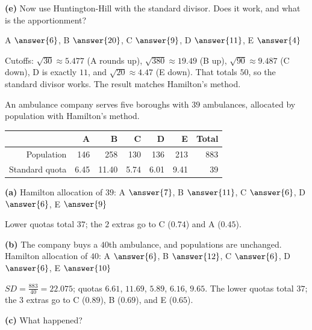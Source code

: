 \documentclass[12pt]{ximera}
\begin{document}
\begin{problem}
\begin{prompt}
\textbf{(e)} Now use Huntington-Hill with the standard divisor. Does it work, and what is
the apportionment?

A $\answer{6}$, B $\answer{20}$, C $\answer{9}$, D $\answer{11}$, E $\answer{4}$
\begin{feedback}
Cutoffs: $\sqrt{30}\approx5.477$ (A rounds up), $\sqrt{380}\approx19.49$ (B up),
$\sqrt{90}\approx9.487$ (C down), D is exactly $11$, and $\sqrt{20}\approx4.47$ (E down).
That totals $50$, so the standard divisor works. The result matches Hamilton's method.
\end{feedback}
\end{prompt}
\end{problem}

\begin{problem}
An ambulance company serves five boroughs with $39$ ambulances, allocated by population
with Hamilton's method.
\begin{center}
\begin{tabular}{r|rrrrrr}
 & A & B & C & D & E & Total\\\hline
Population & 146 & 258 & 130 & 136 & 213 & 883\\
Standard quota & 6.45 & 11.40 & 5.74 & 6.01 & 9.41 & 39
\end{tabular}
\end{center}

\begin{prompt}
\textbf{(a)} Hamilton allocation of $39$: A $\answer{7}$, B $\answer{11}$, C $\answer{6}$,
D $\answer{6}$, E $\answer{9}$
\begin{feedback}
Lower quotas total $37$; the $2$ extras go to C ($0.74$) and A ($0.45$).
\end{feedback}
\end{prompt}

\begin{prompt}
\textbf{(b)} The company buys a $40$th ambulance, and populations are unchanged. Hamilton
allocation of $40$: A $\answer{6}$, B $\answer{12}$, C $\answer{6}$, D $\answer{6}$,
E $\answer{10}$
\begin{feedback}
$SD=\frac{883}{40}=22.075$; quotas $6.61$, $11.69$, $5.89$, $6.16$, $9.65$. The lower
quotas total $37$; the $3$ extras go to C ($0.89$), B ($0.69$), and E ($0.65$).
\end{feedback}
\end{prompt}

\begin{prompt}
\textbf{(c)} What happened?
\begin{multipleChoice}
\end{multipleChoice}
\end{prompt}
\end{problem}
\end{document}
